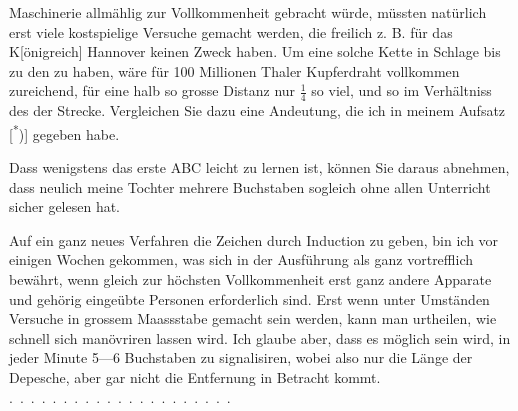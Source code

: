 Maschinerie allmählig zur Vollkommenheit gebracht würde, müssten natürlich
erst viele kostspielige Versuche gemacht werden, die freilich z. B. für
das K[önigreich] Hannover keinen Zweck haben. Um eine solche Kette in
 Schlage bis zu den  zu haben, wäre für 100 Millionen
Thaler Kupferdraht vollkommen zureichend, für eine halb so grosse Distanz
nur \(\frac{1}{4}\) so viel, und so im Verhältniss des  der Strecke. Vergleichen
Sie dazu eine Andeutung, die ich in meinem Aufsatz\,[\textsuperscript{*})] gegeben habe.\begingroup\renewcommand{\thefootnote}{}
\endgroup

Dass wenigstens das erste ABC leicht zu lernen ist, können Sie daraus
abnehmen, dass neulich meine Tochter mehrere Buchstaben sogleich ohne
allen Unterricht sicher gelesen hat.

Auf ein ganz neues Verfahren die Zeichen durch Induction zu geben,
bin ich vor einigen Wochen gekommen, was sich in der Ausführung als ganz
vortrefflich bewährt, wenn gleich zur höchsten Vollkommenheit erst ganz
andere Apparate und gehörig eingeübte Personen erforderlich sind. Erst
wenn unter  Umständen Versuche in grossem Maassstabe gemacht
sein werden, kann man urtheilen, wie schnell sich manövriren lassen wird.
Ich glaube aber, dass es möglich sein wird, in jeder Minute 5—6 Buchstaben
zu signalisiren, wobei also nur die Länge der Depesche, aber gar nicht die
Entfernung in Betracht kommt. \mbox{.\ .\ .\ .\ .\ .\ .\ .\ .\ .\ .\ .\ .\ .\ .\ .\ .\ .\ .\ .\ .}
\clearpage\endgroup
